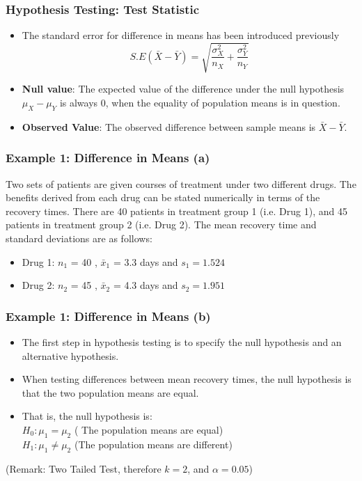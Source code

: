 \documentclass[a4]{beamer}
\begin{document}
\begin{frame}
\frametitle{Hypothesis Testing: Test Statistic}

\begin{itemize}
\item The standard error for difference in means has been introduced previously
\[ S.E(\bar{X} - \bar{Y}) = \sqrt{\frac{\sigma^2_X}{n_X} + \frac{\sigma^2_Y}{n_Y}} \]
\item \textbf{Null value}: The expected value of the difference under the null hypothesis $\mu_X - \mu_Y$ is always 0, when the equality of population means is in question.
\item \textbf{Observed Value}: The observed difference between sample means is $\bar{X} - \bar{Y}$.
\end{itemize}



\end{frame}


\begin{frame}
\frametitle{Example 1: Difference in Means (a) }
Two sets of patients are given courses of treatment under two different drugs. The benefits
derived from each drug can be stated numerically in terms of the recovery times. There are 40 patients in treatment group 1 (i.e. Drug 1), and 45 patients in treatment group 2 (i.e. Drug 2). The mean recovery time and standard deviations are as follows:
\begin{itemize}
\item Drug 1:  $n_1$ = 40 , $\bar{x}_1$ = 3.3 days and $s_1 = 1.524$
\item Drug 2:  $n_2$ = 45 , $\bar{x}_2$ = 4.3 days and $s_2 = 1.951 $
\end{itemize}
\end{frame}

\begin{frame}
\frametitle{Example 1: Difference in Means (b) }
\begin{itemize}
\item The first step in hypothesis testing is to specify the null hypothesis and an alternative hypothesis.
\item When testing differences between mean recovery times, the null hypothesis is that the two population means are equal.
\item That is, the null hypothesis is:\\
$H_0: \mu_1 = \mu_2$ ( The population means are equal)\\
$H_1: \mu_1 \neq \mu_2$ (The population means are different)
\end{itemize}



(Remark: Two Tailed Test, therefore $k = 2$, and $\alpha = 0.05$)
\end{frame}
\end{document}

